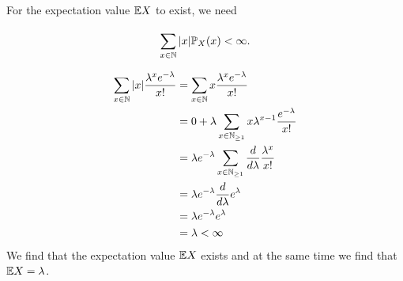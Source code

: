 
For the expectation value $ \mathbb{E} X$ to exist, we need

\[
    \sum_{x \in \mathbb{N}}^{} |x| \mathbb P_{X} (x) < \infty
.\] 

\begin{align*}
    \sum_{x\in \mathbb{N}}^{} |x| \frac{\lambda^{x} e^{-\lambda} }{x!} &= \sum_{x \in \mathbb{N}}^{} x \frac{\lambda^{x} e^{-\lambda} }{x!} \\
							       &= 0 +  \lambda \sum_{x\in \mathbb{N}_{\geq
								   1} }^{} x \lambda^{x-1}
							       \frac{e^{-\lambda}}{x!}\\
							       &= \lambda e^{-\lambda} \sum_{x\in \mathbb{N}_{\geq 1} }^{} \frac{d}{d\lambda} \frac{\lambda^{x} }{x!}  \\
							       &= \lambda e^{-\lambda}\frac{d}{d\lambda} e^{\lambda} \\
							       &= \lambda e^{-\lambda} e^{\lambda}\\
							       &= \lambda < \infty
\end{align*}
We find that the expectation value $ \mathbb{E} X$ exists and at the same time we find that $ \mathbb{E} X =
\lambda$.


